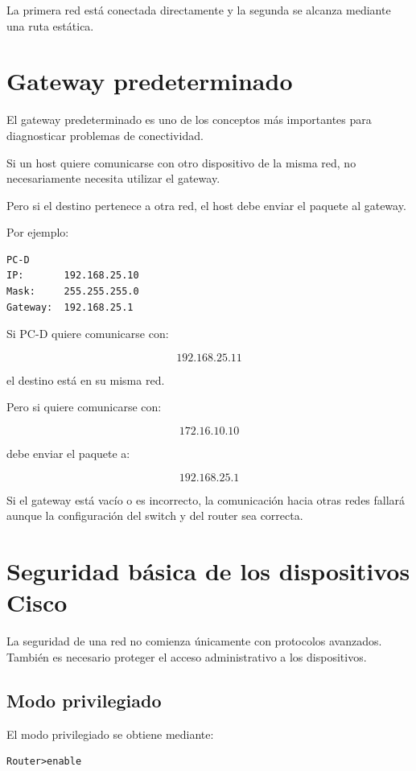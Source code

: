 \documentclass[12pt]{article}
\begin{document}
La primera red está conectada directamente y la segunda se alcanza mediante
una ruta estática.


\section{Gateway predeterminado}

El gateway predeterminado es uno de los conceptos más importantes para
diagnosticar problemas de conectividad.

Si un host quiere comunicarse con otro dispositivo de la misma red, no
necesariamente necesita utilizar el gateway.

Pero si el destino pertenece a otra red, el host debe enviar el paquete al
gateway.

Por ejemplo:

\begin{lstlisting}
PC-D
IP:       192.168.25.10
Mask:     255.255.255.0
Gateway:  192.168.25.1
\end{lstlisting}

Si PC-D quiere comunicarse con:

\[
192.168.25.11
\]

el destino está en su misma red.

Pero si quiere comunicarse con:

\[
172.16.10.10
\]

debe enviar el paquete a:

\[
192.168.25.1
\]

Si el gateway está vacío o es incorrecto, la comunicación hacia otras redes
fallará aunque la configuración del switch y del router sea correcta.


\section{Seguridad básica de los dispositivos Cisco}

La seguridad de una red no comienza únicamente con protocolos avanzados.
También es necesario proteger el acceso administrativo a los dispositivos.


\subsection{Modo privilegiado}

El modo privilegiado se obtiene mediante:

\begin{lstlisting}
Router>enable
\end{lstlisting}
\end{document}
